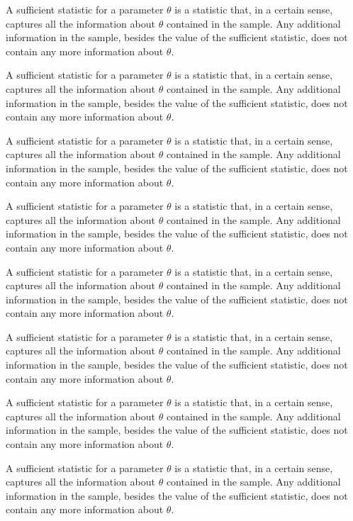 A sufficient statistic for a parameter $\theta$ is a statistic that, in a certain sense, captures all the information about $\theta$ contained in the sample. Any additional information in the sample, besides the value of the sufficient statistic, does not contain any more information about $\theta$.

A sufficient statistic for a parameter $\theta$ is a statistic that, in a certain sense, captures all the information about $\theta$ contained in the sample. Any additional information in the sample, besides the value of the sufficient statistic, does not contain any more information about $\theta$.

A sufficient statistic for a parameter $\theta$ is a statistic that, in a certain sense, captures all the information about $\theta$ contained in the sample. Any additional information in the sample, besides the value of the sufficient statistic, does not contain any more information about $\theta$.

A sufficient statistic for a parameter $\theta$ is a statistic that, in a certain sense, captures all the information about $\theta$ contained in the sample. Any additional information in the sample, besides the value of the sufficient statistic, does not contain any more information about $\theta$.

A sufficient statistic for a parameter $\theta$ is a statistic that, in a certain sense, captures all the information about $\theta$ contained in the sample. Any additional information in the sample, besides the value of the sufficient statistic, does not contain any more information about $\theta$.

A sufficient statistic for a parameter $\theta$ is a statistic that, in a certain sense, captures all the information about $\theta$ contained in the sample. Any additional information in the sample, besides the value of the sufficient statistic, does not contain any more information about $\theta$.

A sufficient statistic for a parameter $\theta$ is a statistic that, in a certain sense, captures all the information about $\theta$ contained in the sample. Any additional information in the sample, besides the value of the sufficient statistic, does not contain any more information about $\theta$.

A sufficient statistic for a parameter $\theta$ is a statistic that, in a certain sense, captures all the information about $\theta$ contained in the sample. Any additional information in the sample, besides the value of the sufficient statistic, does not contain any more information about $\theta$.

